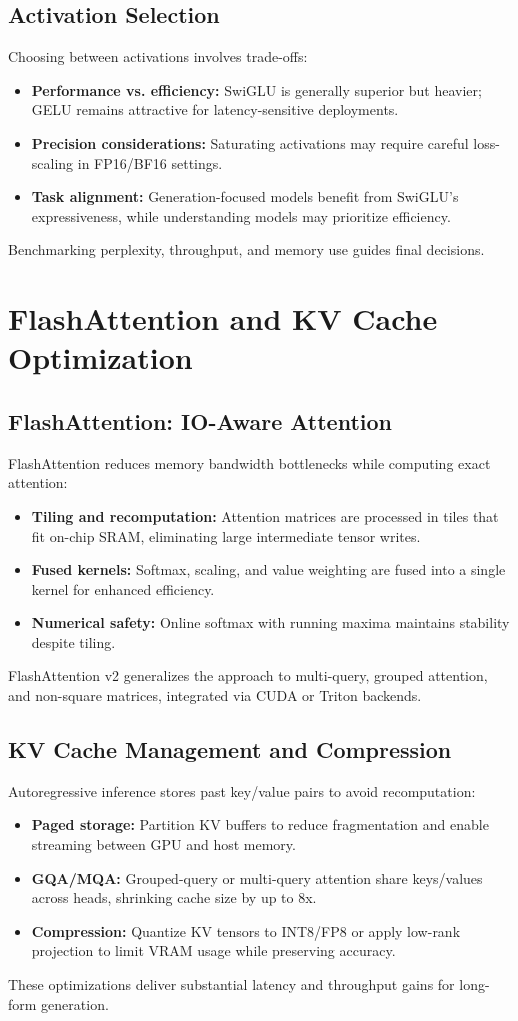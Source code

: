 \documentclass{article}
\begin{document}
\subsection{Activation Selection}
Choosing between activations involves trade-offs:
\begin{itemize}
  \item \textbf{Performance vs. efficiency:} SwiGLU is generally superior but heavier; GELU remains attractive for latency-sensitive deployments.
  \item \textbf{Precision considerations:} Saturating activations may require careful loss-scaling in FP16/BF16 settings.
  \item \textbf{Task alignment:} Generation-focused models benefit from SwiGLU's expressiveness, while understanding models may prioritize efficiency.
\end{itemize}
Benchmarking perplexity, throughput, and memory use guides final decisions.

\section{FlashAttention and KV Cache Optimization}
\subsection{FlashAttention: IO-Aware Attention}
FlashAttention reduces memory bandwidth bottlenecks while computing exact attention:
\begin{itemize}
  \item \textbf{Tiling and recomputation:} Attention matrices are processed in tiles that fit on-chip SRAM, eliminating large intermediate tensor writes.
  \item \textbf{Fused kernels:} Softmax, scaling, and value weighting are fused into a single kernel for enhanced efficiency.
  \item \textbf{Numerical safety:} Online softmax with running maxima maintains stability despite tiling.
\end{itemize}
FlashAttention v2 generalizes the approach to multi-query, grouped attention, and non-square matrices, integrated via CUDA or Triton backends.

\subsection{KV Cache Management and Compression}
Autoregressive inference stores past key/value pairs to avoid recomputation:
\begin{itemize}
  \item \textbf{Paged storage:} Partition KV buffers to reduce fragmentation and enable streaming between GPU and host memory.
  \item \textbf{GQA/MQA:} Grouped-query or multi-query attention share keys/values across heads, shrinking cache size by up to 8x.
  \item \textbf{Compression:} Quantize KV tensors to INT8/FP8 or apply low-rank projection to limit VRAM usage while preserving accuracy.
\end{itemize}
These optimizations deliver substantial latency and throughput gains for long-form generation.
\end{document}
